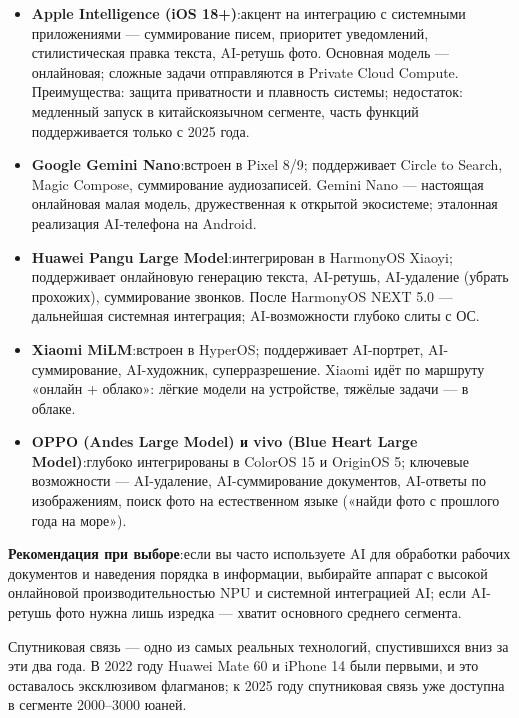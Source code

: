 \begin{itemize}
  \item \textbf{Apple Intelligence (iOS 18+)}:акцент на интеграцию с системными приложениями — суммирование писем, приоритет уведомлений, стилистическая правка текста, AI-ретушь фото. Основная модель — онлайновая; сложные задачи отправляются в Private Cloud Compute. Преимущества: защита приватности и плавность системы; недостаток: медленный запуск в китайскоязычном сегменте, часть функций поддерживается только с 2025 года.
  \item \textbf{Google Gemini Nano}:встроен в Pixel 8/9; поддерживает Circle to Search, Magic Compose, суммирование аудиозаписей. Gemini Nano — настоящая онлайновая малая модель, дружественная к открытой экосистеме; эталонная реализация AI-телефона на Android.
  \item \textbf{Huawei Pangu Large Model}:интегрирован в HarmonyOS Xiaoyi; поддерживает онлайновую генерацию текста, AI-ретушь, AI-удаление (убрать прохожих), суммирование звонков. После HarmonyOS NEXT 5.0 — дальнейшая системная интеграция; AI-возможности глубоко слиты с ОС.
  \item \textbf{Xiaomi MiLM}:встроен в HyperOS; поддерживает AI-портрет, AI-суммирование, AI-художник, суперразрешение. Xiaomi идёт по маршруту «онлайн + облако»: лёгкие модели на устройстве, тяжёлые задачи — в облаке.
  \item \textbf{OPPO (Andes Large Model) и vivo (Blue Heart Large Model)}:глубоко интегрированы в ColorOS 15 и OriginOS 5; ключевые возможности — AI-удаление, AI-суммирование документов, AI-ответы по изображениям, поиск фото на естественном языке («найди фото с прошлого года на море»).
\end{itemize}

\textbf{Рекомендация при выборе}:если вы часто используете AI для обработки рабочих документов и наведения порядка в информации, выбирайте аппарат с высокой онлайновой производительностью NPU и системной интеграцией AI; если AI-ретушь фото нужна лишь изредка — хватит основного среднего сегмента.


Спутниковая связь — одно из самых реальных технологий, спустившихся вниз за эти два года. В 2022 году Huawei Mate 60 и iPhone 14 были первыми, и это оставалось эксклюзивом флагманов; к 2025 году спутниковая связь уже доступна в сегменте 2000–3000 юаней.


